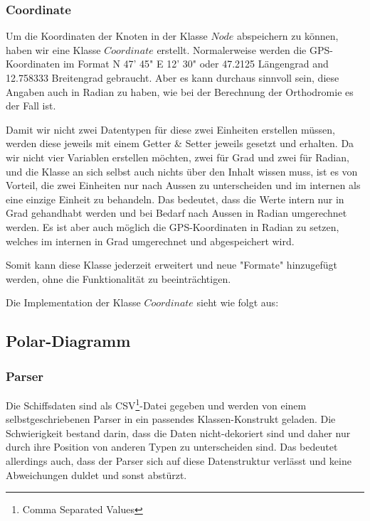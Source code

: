 \subsubsection{Coordinate}
Um die Koordinaten der Knoten in der Klasse $Node$ abspeichern zu können,
haben wir eine Klasse $Coordinate$ erstellt. Normalerweise werden die
GPS-Koordinaten im Format N 47' 45" E 12' 30" oder 47.2125
Längengrad and 12.758333 Breitengrad gebraucht. Aber es kann durchaus sinnvoll
sein, diese Angaben auch in Radian zu haben, wie bei der Berechnung der
Orthodromie es der Fall ist. 

Damit wir nicht zwei Datentypen für diese zwei Einheiten erstellen müssen,
werden diese jeweils mit einem Getter \& Setter jeweils gesetzt und erhalten.
Da wir nicht vier Variablen erstellen möchten, zwei für Grad und zwei für
Radian, und die Klasse an sich selbst auch nichts über den Inhalt wissen muss,
ist es von Vorteil, die zwei Einheiten nur nach Aussen zu unterscheiden und im
internen als eine einzige Einheit zu behandeln. Das bedeutet, dass die Werte
intern nur in Grad gehandhabt werden und bei Bedarf nach Aussen in Radian
umgerechnet werden. Es ist aber auch möglich die GPS-Koordinaten in Radian zu
setzen, welches im internen in Grad umgerechnet und abgespeichert wird. 

Somit kann diese Klasse jederzeit erweitert und neue "Formate" hinzugefügt
werden, ohne die Funktionalität zu beeinträchtigen.

Die Implementation der Klasse $Coordinate$ sieht wie folgt aus:





\subsection{Polar-Diagramm}
\subsubsection{Parser}

Die Schiffsdaten sind als CSV\footnote{Comma Separated Values}-Datei gegeben
und werden von einem selbst\-geschriebenen Parser in ein passendes
Klassen-Konstrukt geladen. Die Schwierigkeit bestand darin, dass die Daten
nicht-dekoriert sind und daher nur durch ihre Position von anderen Typen zu
unterscheiden sind. Das bedeutet allerdings auch, dass der Parser sich auf
diese Datenstruktur verlässt und keine Abweichungen duldet und sonst abstürzt.

